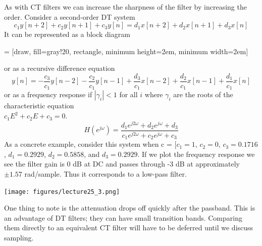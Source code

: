 \begin{example} As with CT filters we can increase the sharpness of the filter by increasing the order. Consider a second-order DT system
\[
c_1 y[n+2] + c_2y[n+1] + c_3y[n] = d_1x[n+2] + d_2x[n+1] + d_3x[n]  
\]
It can be represented as a block diagram
\begin{center}
   = [draw, fill=gray!20, rectangle, 
      minimum height=2em, minimum width=2em]
\end{center}
or as a recursive difference equation
\[
y[n] = -\frac{c_3}{c_1} y[n-2] - \frac{c_2}{c_1} y[n-1] + \frac{d_3}{c_1} x[n-2] + \frac{d_2}{c_1} x[n-1] + \frac{d_1}{c_1} x[n] 
\]
or as a frequency response if $|\gamma_i| < 1$ for all $i$ where $\gamma_i$ are the roots of the characteristic equation\\ $c_1 E^2 + c_2 E + c_3 = 0$.
\[
H\left(e^{j\omega}\right) = \frac{d_1 e^{j2\omega} + d_2 e^{j\omega} + d_3}{c_1 e^{j2\omega} + c_2 e^{j\omega} + c_3} 
\]
As a concrete example, consider this system when c = [$c_1 = 1$, $c_2 = 0$, $c_3 = 0.1716$, $d_1 = 0.2929$, $d_2 = 0.5858$, and $d_3 = 0.2929$. If we plot the frequency response we see the filter gain is 0 dB at DC and passes through -3 dB at approximately $\pm 1.57$ rad/sample. Thus it corresponds to a low-pass filter.
\begin{center}   
  \texttt{[image: figures/lecture25\_3.png]}
\end{center}
One thing to note is the attenuation drops off quickly after the passband. This is an advantage of DT filters; they can have small transition bands. Comparing them directly to an equivalent CT filter will have to be deferred until we discuss sampling.


\end{example}
